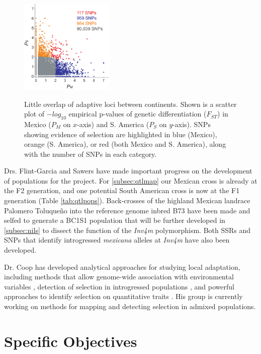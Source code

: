 \begin{figure}
  \centering \label{fig:fst}
   \includegraphics[width=0.4\textwidth]{fst.pdf}
  \caption{Little overlap of adaptive loci between continents. Shown is a scatter plot of $-log_{10}$ empirical p-values of genetic differentiation ($F_{ST}$) in Mexico ($P_M$ on $x$-axis) and S. America ($P_S$ on $y$-axis).  SNPs showing evidence of selection are highlighted in blue (Mexico), orange (S. America), or red (both Mexico and S. America), along with the number of SNPs in each category.} 
\end{figure}

Drs. Flint-Garcia and Sawers have made important progress on the development of populations for the project. For \ref{subsec:qtlmap} our Mexican cross is already at the F2 generation, and one potential South American cross is now at the F1 generation  (Table \ref{tab:qtlpops}).  Back-crosses of the highland Mexican landrace Palomero Toluque\~no into the reference genome inbred B73 have been made and selfed to generate a BC1S1 population that will be further developed in \ref{subsec:nils} to dissect the function of the \emph{Inv4m} polymorphism. Both SSRs and SNPs that identify introgressed  \emph{mexicana} alleles at \emph{Inv4m} have also been developed.

Dr. Coop has developed analytical approaches for studying local adaptation, including methods that allow genome-wide association with environmental variables \citep{Coop2010, gunther2013robust}, detection of selection in introgressed populations \citep{Brandvain2013}, and powerful approaches to identify selection on quantitative traits \cite{Berg2013}.  His group is currently working on methods for mapping and detecting selection in admixed populations.

\section*{Specific Objectives}

